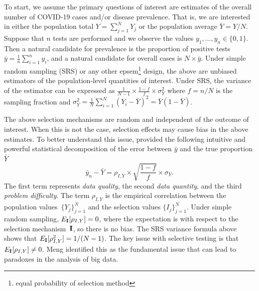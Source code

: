 \documentclass[aoas]{amsart}
\def\I{\bf I}
\begin{document}
To start, we assume the primary questions of interest are estimates of the overall number of COVID-19 cases and/or disease prevalence. That is, we are interested in either the population total $Y = \sum_{j=1}^N Y_j$ or the population average $\bar Y = Y/N$. Suppose that $n$ tests are performed and we observe the values $y_1, \ldots, y_n \in \{0,1\}$.  Then a natural candidate for prevalence is the proportion of positive tests $\bar y = \frac{1}{n} \sum_{i=1}^n y_i$, and a natural candidate for overall cases is $N \times \bar y$.
Under simple random sampling (SRS) or any other epsem\footnote{equal probability of selection method} design, the above are unbiased estimators of the population-level quantities of interest.  Under SRS, the variance of the estimator can be expressed as $\frac{1}{N-1} \times \frac{1-f}{f} \times \sigma_Y^2$ where $f = n/N$ is the sampling fraction and $\sigma_Y^2 = \frac{1}{N} \sum_{i=1}^N (Y_i - \bar Y)^2 = \bar Y (1- \bar Y)$.

The above selection mechanisms are random and independent of the outcome of interest. When this is not the case, selection effects may cause bias in the above estimates. To better understand this issue, \cite{Meng2018} provided the following intuitive and powerful statistical decomposition of the error between $\bar y$ and the true proportion $\bar Y$
$$
\bar y_n - \bar Y =  \rho_{I, Y} \times \sqrt{\frac{1-f}{f}} \times \sigma_Y.
$$
The first term represents \emph{data quality}, the second \emph{data quantity}, and the third \emph{problem difficulty}. The term $\rho_{I,Y}$ is the empirical correlation between the population values~$\{ Y_j \}_{j=1}^N$ and the selection values $\{ I_j \}_{j=1}^N$.  Under simple random sampling, $E_{\I} [ \rho_{I,Y} ] = 0$, where the expectation is with respect to the selection mechanism~$\I$, so there is no bias.  The SRS variance formula above shows that $E_{\I} [ \rho_{I,Y}^2 ]  = 1/(N-1)$.  The key issue with selective testing is that $E_{\I} [ \rho_{I,Y} ] \neq 0$.  Meng identified this as the fundamental issue that can lead to paradoxes in the analysis of big data.
\end{document}
